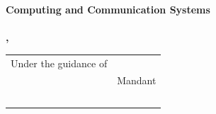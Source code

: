 \begin{titlepage}
\begin{center}
{{		%
		{\large
		\fontsize{14pt}{20pt} \textbf{Computing and Communication Systems\\ \Orientation }\\[32pt]

		\textbf{\Month, \Year}}\\[49pt]

		{
		\begin{tabular*}{16cm}{>{\centering}m{7.59cm}>{\centering}m{7.58cm}}
			Under the guidance of\\[13pt]
			\textbf{ \Professor }
			&
			Mandant\\[12pt]
			\textbf{ \Client }
		\end{tabular*}
		}
		}
		\vfill
		}%
	\end{center}
\end{titlepage}
\addtocounter{page}{1}
